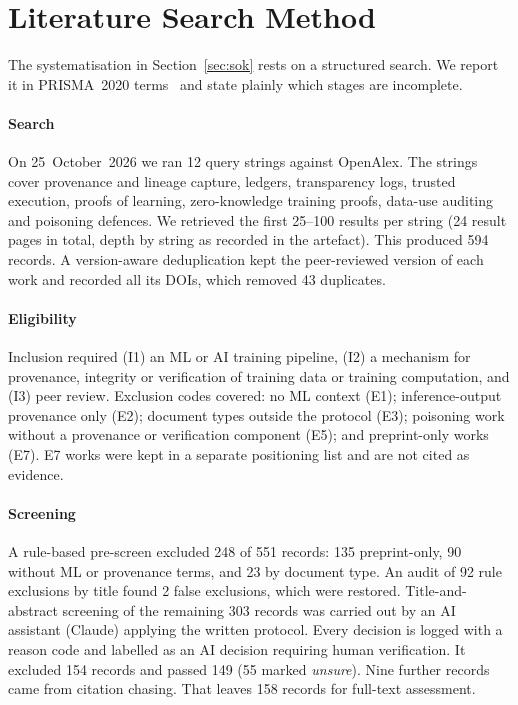 \section{Literature Search Method}\label{sec:lit}

The systematisation in Section~\ref{sec:sok} rests on a structured search. We report it
in PRISMA~2020 terms~\cite{page2021prisma} and state plainly which stages are incomplete.

\paragraph{Search}
On 25~October~2026 we ran 12 query strings against OpenAlex. The strings cover provenance
and lineage capture, ledgers, transparency logs, trusted execution, proofs of learning,
zero-knowledge training proofs, data-use auditing and poisoning defences. We retrieved
the first 25--100 results per string (24 result pages in total, depth by string as
recorded in the artefact). This produced 594 records. A version-aware deduplication kept
the peer-reviewed version of each work and recorded all its DOIs, which removed 43
duplicates.

\paragraph{Eligibility}
Inclusion required (I1) an ML or AI training pipeline, (I2) a mechanism for provenance,
integrity or verification of training data or training computation, and (I3) peer review.
Exclusion codes covered: no ML context (E1); inference-output provenance only (E2);
document types outside the protocol (E3); poisoning work without a provenance or
verification component (E5); and preprint-only works (E7). E7 works were kept in a
separate positioning list and are not cited as evidence.

\paragraph{Screening}
A rule-based pre-screen excluded 248 of 551 records: 135 preprint-only, 90 without ML or
provenance terms, and 23 by document type. An audit of 92 rule exclusions by title found
2 false exclusions, which were restored. Title-and-abstract screening of the remaining 303
records was carried out by an AI assistant (Claude) applying the written protocol. Every
decision is logged with a reason code and labelled as an AI decision requiring human
verification. It excluded 154 records and passed 149 (55 marked \emph{unsure}). Nine further
records came from citation chasing. That leaves 158 records for full-text assessment.


